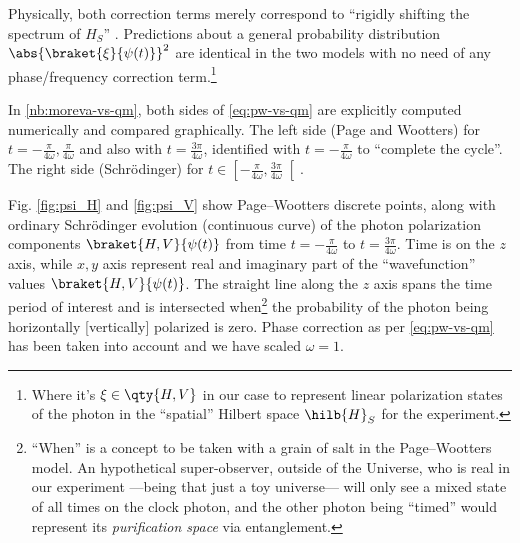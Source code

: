 Physically, both correction terms merely
correspond to ``rigidly shifting the spectrum of $H_S$'' \parencite{Lloyd:Time}.
Predictions about a general probability distribution
$\abs{\braket{\xi}{\psi(t)}}^2$
are identical in the two models with no need of any phase/frequency correction term.\footnote{
  Where it's $\xi \in \qty{H, V}$
  in our case to represent linear polarization states of the photon in
  the ``spatial'' Hilbert space $\hilb{H}_S$
  for the experiment.
}

\begin{spacing}{1.5}
  In \ref{nb:moreva-vs-qm},
  both sides of \eqref{eq:pw-vs-qm} are
  explicitly computed numerically and compared graphically.
  The left side (Page and Wootters)
  for $t = -\frac{\pi}{4\omega}, \frac{\pi}{4\omega}$ and also with
  $t = \frac{3\pi}{4\omega}$, identified with $t = -\frac{\pi}{4\omega}$
  to ``complete the cycle''.
  The right side (Schr{\"o}dinger) for
  $t \in \left[-\frac{\pi}{4\omega}, \frac{3\pi}{4\omega}\right[$.
\end{spacing}

Fig. \ref{fig:psi_H} and \ref{fig:psi_V} show
Page--Wootters discrete points, along with
ordinary Schr{\"o}dinger evolution (continuous curve)
of the photon polarization components
$\braket{H,V}{\psi(t)}$
from time $t = -\frac{\pi}{4\omega}$
to $t = \frac{3\pi}{4\omega}$. Time is on the $z$ axis,
while $x, y$ axis represent real and imaginary part of
the ``wavefunction'' values $\braket{H,V}{\psi(t)}$.
The straight line along the $z$ axis
spans the time period of interest
and is intersected when\footnote{
  ``When'' is a concept to be taken with a grain of salt in the Page--Wootters model.
  An hypothetical super-observer, outside of the Universe,
  who is real in our experiment ---being that just a toy universe---
  will only see a mixed state of all times on the clock photon, and the other
  photon being ``timed'' would represent its \emph{purification space}
  via entanglement.
}
the probability of the photon being
horizontally [vertically] polarized is zero.
Phase correction as per \eqref{eq:pw-vs-qm} has been taken into account
and we have scaled $\omega=1$.

